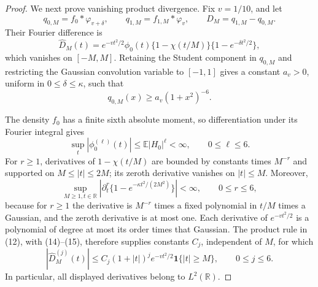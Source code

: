 \documentclass{article}
\begin{document}
\begin{proof}
We next prove vanishing product divergence.  Fix \(v=1/10\), and let
\[
 q_{0,M}=f_0*\varphi_{v+\delta},\qquad
 q_{1,M}=f_{1,M}*\varphi_v,
 \qquad D_M=q_{1,M}-q_{0,M}.
\]
Their Fourier difference is
\[
 \widehat D_M(t)=e^{-vt^2/2}\phi_0(t)
 \{1-\chi(t/M)\}\{1-e^{-\delta t^2/2}\}, \tag{12}
\]
which vanishes on \([-M,M]\).  Retaining the Student component in \(q_{0,M}\) and restricting the Gaussian convolution variable to \([-1,1]\) gives a constant \(a_v>0\), uniform in \(0\le\delta\le\kappa\), such that
\[
 q_{0,M}(x)\ge a_v(1+x^2)^{-6}. \tag{13}
\]

The density \(f_0\) has a finite sixth absolute moment, so differentiation under its Fourier integral gives
\[
 \sup_t|\phi_0^{(\ell)}(t)|
 \le\mathbb E|H_0|^\ell<\infty,
 \qquad0\le\ell\le6. \tag{14}
\]
For \(r\ge1\), derivatives of \(1-\chi(t/M)\) are bounded by constants times \(M^{-r}\) and supported on \(M\le|t|\le2M\); its zeroth derivative vanishes on \(|t|\le M\).  Moreover,
\[
 \sup_{M\ge1,t\in\mathbb R}
 \left|\partial_t^r\{1-e^{-\kappa t^2/(2M^2)}\}\right|<\infty,
 \qquad0\le r\le6, \tag{15}
\]
because for \(r\ge1\) the derivative is \(M^{-r}\) times a fixed polynomial in \(t/M\) times a Gaussian, and the zeroth derivative is at most one.  Each derivative of \(e^{-vt^2/2}\) is a polynomial of degree at most its order times that Gaussian.  The product rule in (12), with (14)--(15), therefore supplies constants \(C_j\), independent of \(M\), for which
\[
 |\widehat D_M^{(j)}(t)|
 \le C_j(1+|t|)^je^{-vt^2/2}\mathbf 1\{|t|\ge M\},
 \qquad0\le j\le6. \tag{16}
\]
In particular, all displayed derivatives belong to \(L^2(\mathbb R)\).


\end{proof}
\end{document}
